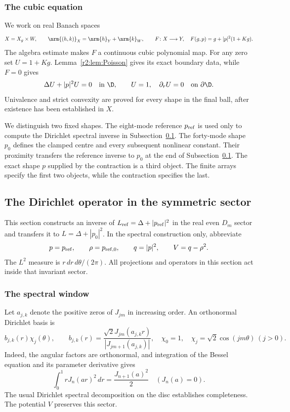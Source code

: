 \subsubsection{The cubic equation}
We work on real Banach spaces
\begin{equation}\label{r2:eq:X}
 X=X_g\times W,\qquad
 \nrm{(h,k)}_X=\nrm{h}_Y+\nrm{k}_W,
 \qquad F\colon X\longrightarrow Y,
 \quad F(g,p)=g+|p|^2(1+Kg).
\end{equation}
The algebra estimate makes $F$ a continuous cubic polynomial map. For any zero set $U=1+Kg$. Lemma~\ref{r2:lem:Poisson} gives its exact boundary data, while $F=0$ gives
\begin{equation}\label{r2:eq:fixed-disc}
 \Delta U+|p|^2U=0\quad\text{in }\D,
 \qquad U=1,\quad\partial_rU=0\quad\text{on }\partial\D.
\end{equation}
Univalence and strict convexity are proved for every shape in the final ball, after existence has been established in $X$.

We distinguish two fixed shapes. The eight-mode reference $p_{\rm ref}$ is used only to compute the Dirichlet spectral inverse in Subsection~\ref{r2:sec:spectrum}. The forty-mode shape $p_0$ defines the clamped centre and every subsequent nonlinear constant. Their proximity transfers the reference inverse to $p_0$ at the end of Subsection~\ref{r2:sec:spectrum}. The exact shape $p$ supplied by the contraction is a third object. The finite arrays specify the first two objects, while the contraction specifies the last.

\subsection{The Dirichlet operator in the symmetric sector}\label{r2:sec:spectrum}

This section constructs an inverse of $L_{\rm ref}=\Delta+|p_{\rm ref}|^2$ in the real even $D_m$ sector and transfers it to $L=\Delta+|p_0|^2$. In the spectral construction only, abbreviate
\[
 p=p_{\rm ref},\qquad \rho=p_{{\rm ref},0},\qquad
 q=|p|^2,\qquad V=q-\rho^2.
\]
The $L^2$ measure is $r\,dr\,d\theta/(2\pi)$. All projections and operators in this section act inside that invariant sector.

\subsubsection{The spectral window}
Let $a_{j,k}$ denote the positive zeros of $J_{jm}$ in increasing order. An orthonormal Dirichlet basis is
\begin{equation}\label{r2:eq:basis}
 b_{j,k}(r)\chi_j(\theta),\qquad
 b_{j,k}(r)=\frac{\sqrt2 J_{jm}(a_{j,k}r)}{|J_{jm+1}(a_{j,k})|},
 \quad \chi_0=1,\quad\chi_j=\sqrt2\cos(jm\theta)\ (j>0).
\end{equation}
Indeed, the angular factors are orthonormal, and integration of the Bessel equation and its parameter derivative gives
\[
 \int_0^1rJ_n(ar)^2\,dr=\frac{J_{n+1}(a)^2}{2}\quad(J_n(a)=0).
\]
The usual Dirichlet spectral decomposition on the disc establishes completeness. The potential $V$ preserves this sector.

